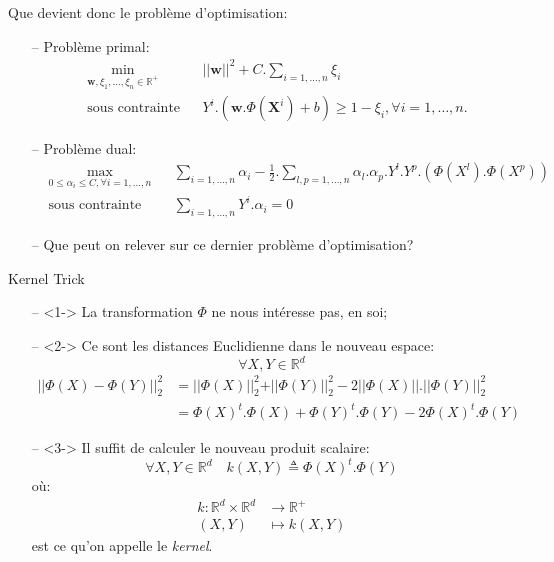 \documentclass[9pt]{beamer}
\begin{document}
	\begin{frame}{Que devient donc le problème d'optimisation:}
		\begin{itemize}
			\item[--] Problème primal:
			\begin{equation}
				\begin{aligned}
				& \min_{\textbf{w}, \xi_1,\dots,\xi_n \in \mathbb{R}^+}
				& & {\vert\vert \textbf{w} \vert\vert}^2 + C.\sum_{i=1,\dots,n}\xi_i \\
				& \text{sous contrainte}
				& & Y^i.(\textbf{w}.\Phi(\textbf{X}^i) + b) \geq 1 - \xi_i , \forall i = 1, \dots, n.
				\end{aligned}
			\end{equation}
			\item[--] Problème dual:
			\begin{equation}
				\begin{aligned}
				& \max_{0 \leq \alpha_i \leq C ,\forall i=1,\dots,n}
				& & \sum_{i=1,\dots,n} \alpha_i - \frac{1}{2}.\sum_{l,p=1,\dots,n}\alpha_l.\alpha_p.Y^l.Y^p.(\Phi(X^l).\Phi(X^p))\\
				& \text{sous contrainte}
				& & \sum_{i=1,\dots,n}Y^i.\alpha_i=0
				\end{aligned}
			\end{equation}
			\item[--] Que peut on relever sur ce dernier problème d'optimisation?
		\end{itemize}
	\end{frame}

	\begin{frame}{Kernel Trick}
		\begin{itemize}
			\item[--]<1-> La transformation $\Phi$ ne nous intéresse pas, en soi;
			\item[--]<2-> Ce sont les distances Euclidienne dans le nouveau espace:
			$$\forall X, Y \in \mathbb{R}^d$$
			\begin{align*}
				\vert\vert\Phi(X) - \Phi(Y)\vert\vert_2^2 &= \vert\vert\Phi(X)\vert\vert_2^2 + \vert\vert\Phi(Y)\vert\vert_2^2 - 2 \vert\vert\Phi(X)\vert\vert.\vert\vert\Phi(Y)\vert\vert_2^2 \\
				 &= {\Phi(X)}^t.\Phi(X) + {\Phi(Y)}^t.\Phi(Y) - 2 {\Phi(X)}^t.\Phi(Y)
			\end{align*}
			\item[--]<3-> Il suffit de calculer le nouveau produit scalaire:
			\begin{equation}
				\forall X, Y \in \mathbb{R}^d \quad k(X, Y) \triangleq {\Phi(X)}^t.\Phi(Y)
			\end{equation}
			où:
			\begin{align*}
				k: \mathbb{R}^d \times \mathbb{R}^d &\rightarrow \mathbb{R}^+ \\
				(X, Y) &\mapsto k(X, Y)
			\end{align*}
			est ce qu'on appelle le \textit{kernel}.
		\end{itemize}
	\end{frame}
\end{document}
